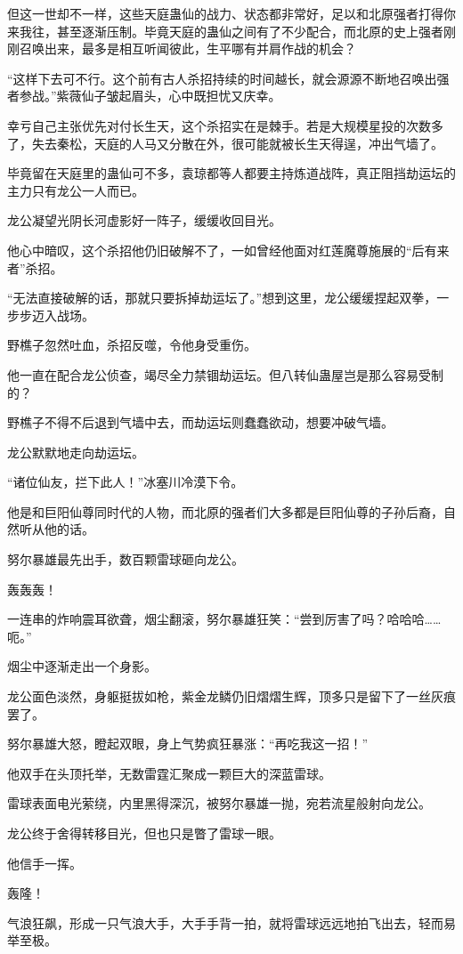 \begin{this_body}
但这一世却不一样，这些天庭蛊仙的战力、状态都非常好，足以和北原强者打得你来我往，甚至逐渐压制。毕竟天庭的蛊仙之间有了不少配合，而北原的史上强者刚刚召唤出来，最多是相互听闻彼此，生平哪有并肩作战的机会？

“这样下去可不行。这个前有古人杀招持续的时间越长，就会源源不断地召唤出强者参战。”紫薇仙子皱起眉头，心中既担忧又庆幸。

幸亏自己主张优先对付长生天，这个杀招实在是棘手。若是大规模星投的次数多了，失去秦松，天庭的人马又分散在外，很可能就被长生天得逞，冲出气墙了。

毕竟留在天庭里的蛊仙可不多，袁琼都等人都要主持炼道战阵，真正阻挡劫运坛的主力只有龙公一人而已。

龙公凝望光阴长河虚影好一阵子，缓缓收回目光。

他心中暗叹，这个杀招他仍旧破解不了，一如曾经他面对红莲魔尊施展的“后有来者”杀招。

“无法直接破解的话，那就只要拆掉劫运坛了。”想到这里，龙公缓缓捏起双拳，一步步迈入战场。

野樵子忽然吐血，杀招反噬，令他身受重伤。

他一直在配合龙公侦查，竭尽全力禁锢劫运坛。但八转仙蛊屋岂是那么容易受制的？

野樵子不得不后退到气墙中去，而劫运坛则蠢蠢欲动，想要冲破气墙。

龙公默默地走向劫运坛。

“诸位仙友，拦下此人！”冰塞川冷漠下令。

他是和巨阳仙尊同时代的人物，而北原的强者们大多都是巨阳仙尊的子孙后裔，自然听从他的话。

努尔暴雄最先出手，数百颗雷球砸向龙公。

轰轰轰！

一连串的炸响震耳欲聋，烟尘翻滚，努尔暴雄狂笑：“尝到厉害了吗？哈哈哈……呃。”

烟尘中逐渐走出一个身影。

龙公面色淡然，身躯挺拔如枪，紫金龙鳞仍旧熠熠生辉，顶多只是留下了一丝灰痕罢了。

努尔暴雄大怒，瞪起双眼，身上气势疯狂暴涨：“再吃我这一招！”

他双手在头顶托举，无数雷霆汇聚成一颗巨大的深蓝雷球。

雷球表面电光萦绕，内里黑得深沉，被努尔暴雄一抛，宛若流星般射向龙公。

龙公终于舍得转移目光，但也只是瞥了雷球一眼。

他信手一挥。

轰隆！

气浪狂飙，形成一只气浪大手，大手手背一拍，就将雷球远远地拍飞出去，轻而易举至极。


\end{this_body}
